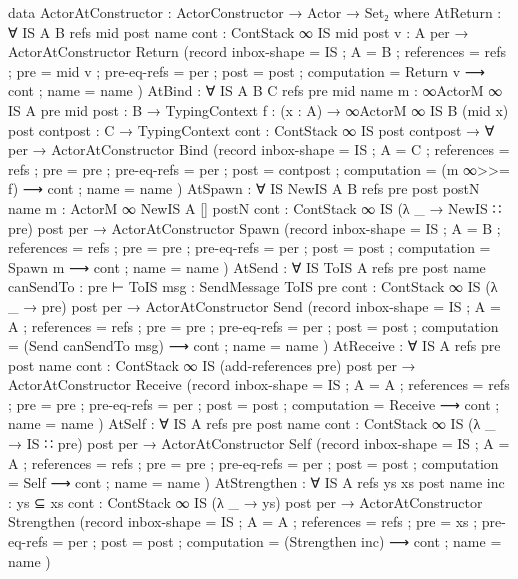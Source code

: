 \begin{code}
data ActorAtConstructor : ActorConstructor → Actor → Set₂ where
  AtReturn :
    ∀ {IS A B refs mid post name}
    {cont : ContStack ∞ IS mid post}
    {v : A}
    {per} →
    ActorAtConstructor Return (record
      { inbox-shape = IS
      ; A = B
      ; references = refs
      ; pre = mid v
      ; pre-eq-refs = per
      ; post = post
      ; computation = Return v ⟶ cont
      ; name = name
      })
  AtBind :
    ∀ {IS A B C refs pre mid name}
    {m : ∞ActorM ∞ IS A pre mid}
    {post : B → TypingContext}
    {f : (x : A) →
    ∞ActorM ∞ IS B (mid x) post}
    {contpost : C → TypingContext}
    {cont : ContStack ∞ IS post contpost} →
    ∀ {per} →
    ActorAtConstructor Bind (record
      { inbox-shape = IS
      ; A = C
      ; references = refs
      ; pre = pre
      ; pre-eq-refs = per
      ; post = contpost
      ; computation = (m ∞>>= f) ⟶ cont
      ; name = name
      })
  AtSpawn :
    ∀ {IS NewIS A B refs pre post postN name}
    {m : ActorM ∞ NewIS A [] postN}
    {cont : ContStack ∞ IS (λ _ → NewIS ∷ pre) post}
    {per} →
    ActorAtConstructor Spawn (record
      { inbox-shape = IS
      ; A = B
      ; references = refs
      ; pre = pre
      ; pre-eq-refs = per
      ; post = post
      ; computation = Spawn m ⟶ cont
      ; name = name
      })
  AtSend :
    ∀ {IS ToIS A refs pre post name}
    {canSendTo : pre ⊢ ToIS}
    {msg : SendMessage ToIS pre}
    {cont : ContStack ∞ IS (λ _ → pre) post}
    {per} →
    ActorAtConstructor Send (record
      { inbox-shape = IS
      ; A = A
      ; references = refs
      ; pre = pre
      ; pre-eq-refs = per
      ; post = post
      ; computation = (Send canSendTo msg) ⟶ cont
      ; name = name
      })
  AtReceive :
    ∀ {IS A refs pre post name}
    {cont : ContStack ∞ IS (add-references pre) post}
    {per} →
    ActorAtConstructor Receive (record
      { inbox-shape = IS
      ; A = A
      ; references = refs
      ; pre = pre
      ; pre-eq-refs = per
      ; post = post
      ; computation = Receive ⟶ cont
      ; name = name
      })
  AtSelf :
    ∀ {IS A refs pre post name}
    {cont : ContStack ∞ IS (λ _ → IS ∷ pre) post}
    {per} →
    ActorAtConstructor Self (record
      { inbox-shape = IS
      ; A = A
      ; references = refs
      ; pre = pre
      ; pre-eq-refs = per
      ; post = post
      ; computation = Self ⟶ cont
      ; name = name
      })
  AtStrengthen :
    ∀ {IS A refs ys xs post name}
    {inc : ys ⊆ xs}
    {cont : ContStack ∞ IS (λ _ → ys) post}
    {per} →
    ActorAtConstructor Strengthen (record
      { inbox-shape = IS
      ; A = A
      ; references = refs
      ; pre = xs
      ; pre-eq-refs = per
      ; post = post
      ; computation = (Strengthen inc) ⟶ cont
      ; name = name
      })


\end{code}
